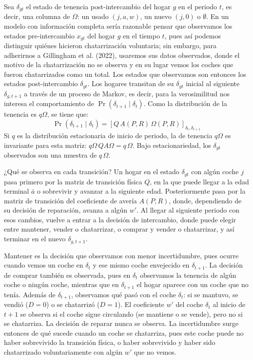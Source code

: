 \documentclass{article}
\begin{document}
Sea $\delta_{gt}$ el estado de tenencia post-intercambio del hogar $g$ en el periodo $t$, es decir, una columna de $\Omega$: un usado $(j,a,w)$, un nuevo $(j,0)$ o $\emptyset$. En un modelo con información completa sería razonable pensar que observamos los estados pre-intercambio $x_{gt}$ del hogar $g$ en el tiempo $t$, pues así podemos distinguir quiénes hicieron chatarrización voluntaria; sin embargo, para adherirnos a Gillingham et al. (2022), usaremos sus datos observados, donde el motivo de la chatarrización no se observa y en su lugar vemos los coches que fueron chatarrizados como un total. Los estados que observamos son entonces los estados post-intercambio $\delta_{gt}$. Los hogares transitan de su $\delta_{gt}$ inicial al siguiente $\delta_{g,t+1}$ a través de un proceso de Markov, es decir, para la verosimilitud nos interesa el comportamiento de $\Pr(\delta_{t+1}\mid \delta_t)$. Como la distribución de la tenencia es $q\Omega$, se tiene que:
$$\Pr(\delta_{t+1}\mid \delta_t)=[Q \,A(P,R)\, \Omega(P,R)]_{\delta_t, \delta_{t+1}}$$
Si $q$ es la distribución estacionaria de inicio de periodo, la de tenencia $q\Omega$ es invariante para esta matriz: $q\Omega\,QA\Omega=q\,\Omega$. Bajo estacionariedad, los $\delta_{gt}$ observados son una muestra de $q\,\Omega$.

¿Qué se observa en cada transición? Un hogar en el estado $\delta_{gt}$ con algún coche $j$ pasa primero por la matriz de transición física $Q$, en la que puede llegar a la edad terminal $\bar{a}$ o sobrevivir y avanzar a la siguiente edad. Posteriormente pasa por la matriz de transición del coeficiente de avería $A(P,R)$, donde, dependiendo de su decisión de reparación, avanza a algún $w'$. Al llegar al siguiente periodo con esos cambios, vuelve a entrar a la decisión de intercambio, donde puede elegir entre mantener, vender o chatarrizar, o comprar y vender o chatarrizar, y así terminar en el nuevo $\delta_{g,t+1}$.

Mantener es la decisión que observamos con menor incertidumbre, pues ocurre cuando vemos un coche en $\delta_t$ y ese mismo coche envejecido en $\delta_{t+1}$. La decisión de comprar también es observada, pues en $\delta_t$ observamos la tenencia de algún coche o ningún coche, mientras que en $\delta_{t+1}$ el hogar aparece con un coche que no tenía. Además de $\delta_{t+1}$, observamos qué pasó con el coche $\delta_t$: si se mantuvo, se vendió ($D=0$) o se chatarrizó ($D=1$). El coeficiente $w'$ del coche $\delta_t$ al inicio de $t+1$ se observa si el coche sigue circulando (se mantiene o se vende), pero no si se chatarriza. La decisión de reparar nunca se observa. La incertidumbre surge entonces de qué sucede cuando un coche se chatarriza, pues este coche puede no haber sobrevivido la transición física, o haber sobrevivido y haber sido chatarrizado voluntariamente con algún $w'$ que no vemos.
\end{document}
